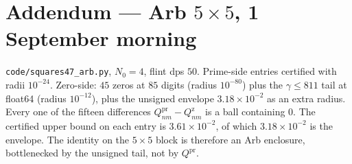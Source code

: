 \documentclass[10pt]{article}
\begin{document}
\section*{Addendum --- Arb $5\times5$, 1 September morning}

\texttt{code/squares47\_arb.py}, $N_0=4$, flint dps $50$. Prime-side
entries certified with radii $10^{-24}$. Zero-side: $45$ zeros at
$85$ digits (radius $10^{-80}$) plus the $\gamma\le811$ tail at
float64 (radius $10^{-12}$), plus the unsigned envelope
$3.18\times10^{-2}$ as an extra radius. Every one of the fifteen
differences $Q^{\mathrm{pr}}_{nm}-Q^{\mathrm{z}}_{nm}$ is a ball
containing $0$. The certified upper bound on each entry is
$3.61\times10^{-2}$, of which $3.18\times10^{-2}$ is the envelope.
The identity on the $5\times5$ block is therefore an Arb enclosure,
bottlenecked by the unsigned tail, not by $Q^{\mathrm{pr}}$.
\end{document}
